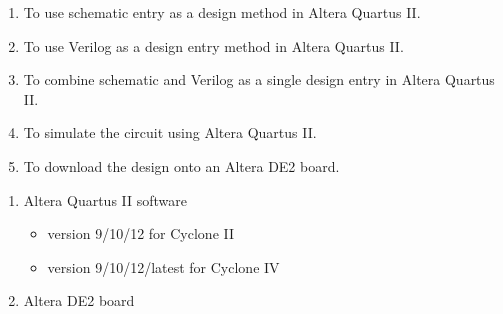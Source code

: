
\begin{objectives}
    \begin{enumerate}
        \item To use schematic entry as a design method in Altera Quartus II.
        \item To use Verilog as a design entry method in Altera Quartus II.
        \item To combine schematic and Verilog as a single design entry in Altera Quartus II.
        \item To simulate the circuit using Altera Quartus II.
        \item To download the design onto an Altera DE2 board.
    \end{enumerate}
\end{objectives}

\begin{equipment}
    \begin{enumerate}
        \item Altera Quartus II software
              \begin{itemize}
                  \item version 9/10/12 for Cyclone II
                  \item version 9/10/12/latest for Cyclone IV
              \end{itemize}
        \item Altera DE2 board
    \end{enumerate}
\end{equipment}

